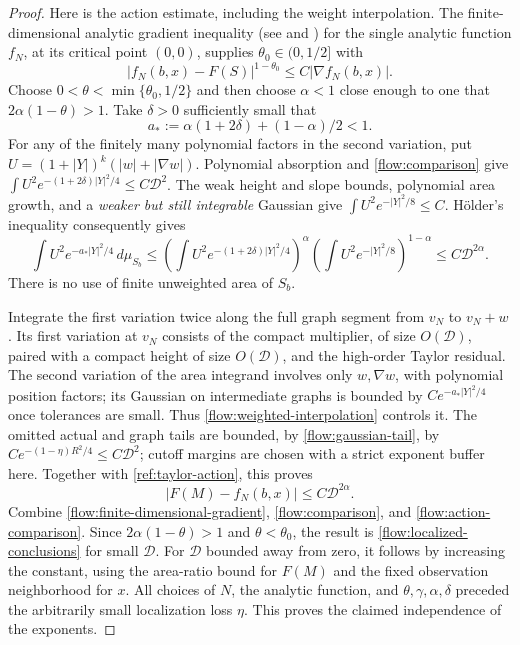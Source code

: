 \begin{proof}
Here is the action estimate, including the weight interpolation.
The finite-dimensional analytic gradient inequality (see
\cite[p.~1592]{Lojasiewicz1993} and
\cite[Section~0.2, equation~(0.4)]{CM2015}) for the single
analytic function $f_N$, at its critical point $(0,0)$, supplies
$\theta_0\in(0,1/2]$ with
\begin{equation}\label{flow:finite-dimensional-gradient}
 |f_N(b,x)-F(S)|^{1-\theta_0}
                     \le C|\nabla f_N(b,x)|.
\end{equation}
Choose $0<\theta<\min\{\theta_0,1/2\}$ and then choose
$\alpha<1$ close enough to one that
$2\alpha(1-\theta)>1$.  Take $\delta>0$ sufficiently small that
\[
 a_*:=\alpha(1+2\delta)+(1-\alpha)/2<1.
\]
For any of the finitely many polynomial factors in the second
variation, put $U=(1+|Y|)^k(|w|+|\nabla w|)$.  Polynomial
absorption and \eqref{flow:comparison} give
$\int U^2e^{-(1+2\delta)|Y|^2/4}\le C\mathcal D^2$.
The weak height and slope bounds, polynomial area growth, and a
\emph{weaker but still integrable} Gaussian give
$\int U^2e^{-|Y|^2/8}\le C$.  H\"older's inequality consequently
gives
\begin{equation}\label{flow:weighted-interpolation}
 \int U^2e^{-a_*|Y|^2/4}\,d\mu_{S_b}
 \le
 \left(\int U^2e^{-(1+2\delta)|Y|^2/4}\right)^\alpha
 \left(\int U^2e^{-|Y|^2/8}\right)^{1-\alpha}
 \le C\mathcal D^{2\alpha}.
\end{equation}
There is no use of finite unweighted area of $S_b$.

Integrate the first variation twice along the full graph segment
from $v_N$ to $v_N+w$.  Its first variation at $v_N$ consists of
the compact multiplier, of size $O(\mathcal D)$, paired with a
compact height of size $O(\mathcal D)$, and the high-order Taylor
residual.  The second variation of the area integrand involves
only $w,\nabla w$, with polynomial position factors; its Gaussian
on intermediate graphs is bounded by
$Ce^{-a_*|Y|^2/4}$ once tolerances are small.  Thus
\eqref{flow:weighted-interpolation} controls it.  The omitted
actual and graph tails are bounded, by \eqref{flow:gaussian-tail},
by $Ce^{-(1-\eta)R^2/4}\le C\mathcal D^2$; cutoff margins are
chosen with a strict exponent buffer here.  Together with
\eqref{ref:taylor-action}, this proves
\begin{equation}\label{flow:action-comparison}
 |F(M)-f_N(b,x)|\le C\mathcal D^{2\alpha}.
\end{equation}
Combine \eqref{flow:finite-dimensional-gradient},
\eqref{flow:comparison}, and \eqref{flow:action-comparison}.
Since $2\alpha(1-\theta)>1$ and $\theta<\theta_0$, the result is
\eqref{flow:localized-conclusions} for small $\mathcal D$.
For $\mathcal D$ bounded away from zero, it follows by increasing
the constant, using the area-ratio bound for $F(M)$ and the fixed
observation neighborhood for $x$.  All choices of $N$, the
analytic function, and $\theta,\gamma,\alpha,\delta$ preceded
the arbitrarily small localization loss $\eta$.  This proves
the claimed independence of the exponents.
\end{proof}

